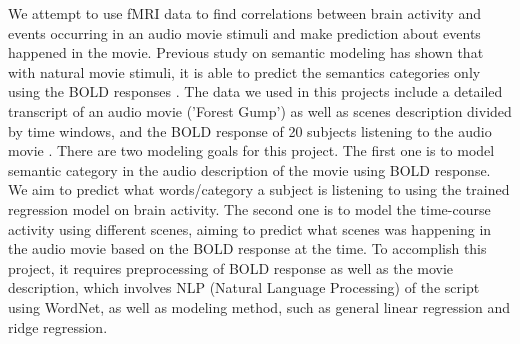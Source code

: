 

\par We attempt to use fMRI data to find correlations between brain activity and events occurring in an audio movie stimuli and make prediction about events happened in the movie. Previous study on semantic modeling has shown that with natural movie stimuli, it is able to predict the semantics categories only using the BOLD responses \cite{stansbury2013neuron}. The data we used in this projects include a detailed transcript of an audio movie ('Forest Gump') as well as scenes description divided by time windows, and the BOLD response of 20 subjects listening to the audio movie \cite{Hanke}. There are two modeling goals for this project. The first one is to model semantic category in the audio description of the movie using BOLD response. We aim to predict what words/category a subject is listening to using the trained regression model on brain activity. The second one is to model the time-course activity using different scenes, aiming to predict what scenes was happening in the audio movie based on the BOLD response at the time. To accomplish this project, it requires preprocessing of BOLD response as well as the movie description, which involves NLP (Natural Language Processing) of the script using WordNet, as well as modeling method, such as general linear regression and ridge regression.

